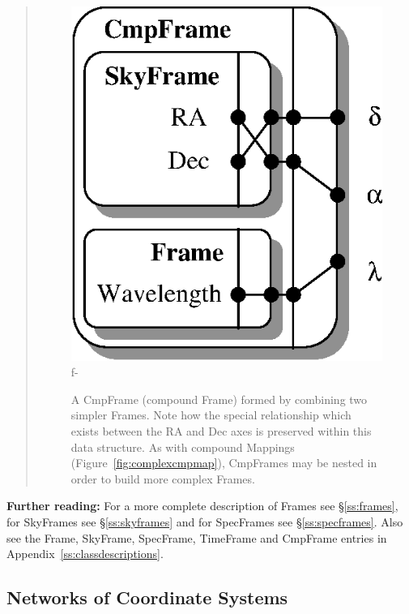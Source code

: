 \documentclass[twoside,11pt]{article}
\newcommand{\appref}[1]{Appendix~\ref{#1}}
\newcommand{\secref}[1]{\S\ref{#1}}
\newcommand{\appref}[1]{\ref{#1}}
\newcommand{\secref}[1]{\ref{#1}}
\begin{document}
\begin{htmlonly}
\begin{quote}
\begin{figure}
   \includegraphics[scale=1.5]{sun210_figures/cmpframe.eps}
f-
   \caption{A CmpFrame (compound Frame) formed by combining two simpler
   Frames. Note how the special relationship which exists between the RA
   and Dec axes is preserved within this data structure. As with compound
   Mappings (Figure~\ref{fig:complexcmpmap}), CmpFrames may be nested in
   order to build more complex Frames.}
   \end{figure}
   \end{quote}
\end{htmlonly}

{\bf{Further reading:}} For a more complete description of Frames see
\secref{ss:frames}, for SkyFrames see \secref{ss:skyframes} and for 
SpecFrames see \secref{ss:specframes}.  Also see the Frame, SkyFrame,
SpecFrame, TimeFrame and CmpFrame entries in \appref{ss:classdescriptions}.

\subsection{Networks of Coordinate Systems}
\end{document}

